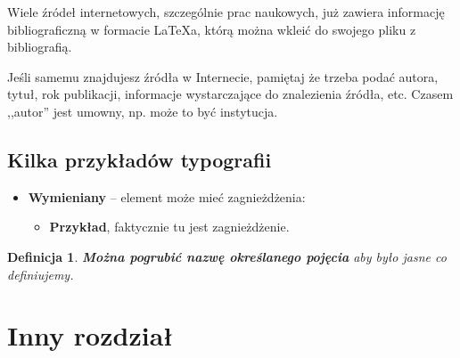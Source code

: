 \documentclass[12pt,a4paper,leqno,oneside,titlepage]{book}
\newtheorem{mydef}{Definicja}
\begin{document}
Wiele źródeł internetowych, szczególnie prac naukowych, już zawiera informację bibliograficzną w formacie \LaTeX{}a, którą można wkleić do swojego pliku z bibliografią.

Jeśli samemu znajdujesz źródła w Internecie, pamiętaj że trzeba podać autora, tytuł, rok publikacji, informacje wystarczające do znalezienia źródła, etc. Czasem ,,autor'' jest umowny, np. może to być instytucja.

\section{Kilka przykładów typografii}

\begin{itemize}
\item \textbf{Wymieniany} -- element może mieć zagnieżdżenia:
    \begin{itemize}
    \item \textbf{Przykład}, faktycznie tu jest zagnieżdżenie.
    \end{itemize}
\end{itemize}

\begin{mydef}
\textbf{Można pogrubić nazwę określanego pojęcia} aby było jasne co definiujemy.
\end{mydef}

\chapter{Inny rozdział}
\end{document}
